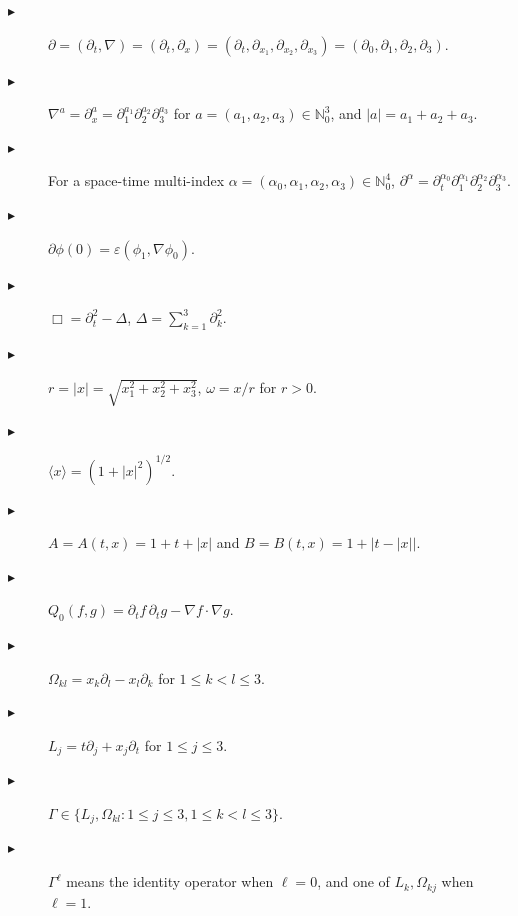 \documentclass[11pt,twoside]{article}
\def\ds{\displaystyle}
\def\p{\partial}
\def\ve{\varepsilon}
\theoremstyle{plain}
\theoremstyle{definition}
\theoremstyle{assumption}
\numberwithin{equation}{section}
\begin{document}
	\begin{description}
		\item [$\blacktriangleright $]
		$\partial=(\partial_t,\nabla)=(\partial_t,\p_x)= (\partial_t,\partial_{x_1},\partial_{x_2},\partial_{x_3})=(\partial_0,\partial_1,\partial_2,\partial_3)$.
		
		\item [$\blacktriangleright $]
		$\nabla^a=\partial_x^a=\partial_1^{a_1}\partial_2^{a_2}\partial_3^{a_3}$ for
		$a=(a_1,a_2,a_3)\in\mathbb N_0^3$, and $|a|=a_1+a_2+a_3$.
		
		\item [$\blacktriangleright $]
		For a space-time multi-index $\alpha=(\alpha_0,\alpha_1,\alpha_2,\alpha_3)\in\mathbb N_0^4$,
		$\partial^\alpha=\partial_t^{\alpha_0}\partial_1^{\alpha_1}
		\partial_2^{\alpha_2}\partial_3^{\alpha_3}$.
		
		\item [$\blacktriangleright $]
		$\p \phi(0) = \ve(\phi_1,\nabla \phi_0).$
		
		\item [$\blacktriangleright $]
		$\Box=\partial_t^2-\Delta$, $\Delta=\ds\sum_{k=1}^3\partial_k^2$.
		
		\item [$\blacktriangleright $]
		$r=|x|=\sqrt{x_1^2+x_2^2+x_3^2}$, $\omega=x/r$ for $r>0$.
		
		\item [$\blacktriangleright $]
		$\langle x\rangle=(1+|x|^2)^{1/2}$.
		
		\item [$\blacktriangleright $]
		$A=A(t,x)=1+t+|x|$ and
		$B=B(t,x)=1+|t-|x||$.
		
		\item [$\blacktriangleright $]
		$Q_0(f,g)=\partial_t f\,\partial_t g-\nabla f\cdot\nabla g$.
		
		
		\item [$\blacktriangleright $]
		$\Omega_{kl}=x_k\partial_l-x_l\partial_k$ for $1\le k<l\le3$.
		
		\item [$\blacktriangleright $]
		$L_j=t\partial_j+x_j\partial_t$ for $1\le j\le3$.
		
		\item [$\blacktriangleright $]
		$\Gamma\in\{L_j,\Omega_{kl}: 1\le j\le3, 1\le k<l\le3\}$.
		
		\item [$\blacktriangleright $]
		$\Gamma^\ell$ means the identity operator when $\ell=0$, and one of
		$L_k,\Omega_{kj}$ when $\ell=1$.
		

\end{description}
\end{document}
